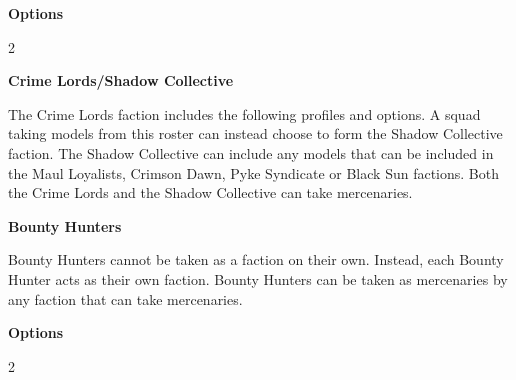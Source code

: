 \documentclass{article}
\begin{document}
{\large \textbf{Options}}
\vspace{0.3cm}
\begin{multicols}{2}
    {\scriptsize

    \setlength\extrarowheight{1.5pt}
    

    }
\end{multicols}

\vspace{0.6cm}

{\Large \textbf{Crime Lords/Shadow Collective}}
\vspace{0.3cm}

\begin{minipage}{19cm}
    The Crime Lords faction includes the following profiles and options.
    A squad taking models from this roster can instead choose to form the
    Shadow Collective faction. 
    The Shadow Collective can include any models that can be included 
    in the Maul Loyalists, Crimson Dawn, Pyke Syndicate or Black Sun factions.
    Both the Crime Lords and the Shadow Collective can take mercenaries.

\end{minipage}

\vspace{0.3cm}
{\scriptsize
\setlength\extrarowheight{1.5pt}

}

\vspace{0.6cm}

\newpage

{\Large \textbf{Bounty Hunters}}
\vspace{0.3cm}

\begin{minipage}{19cm}
    Bounty Hunters cannot be taken as a faction on their own.
    Instead, each Bounty Hunter acts as their own faction.
    Bounty Hunters can be taken as mercenaries
    by any faction that can take mercenaries.
\end{minipage}

\vspace{0.3cm}
{\scriptsize
\setlength\extrarowheight{1.5pt}

}
\vspace{0.6cm}

{\large \textbf{Options}}
\vspace{0.3cm}
\begin{multicols}{2}
    {\scriptsize

    \setlength\extrarowheight{1.5pt}
    

    }
\end{multicols}
\end{document}
